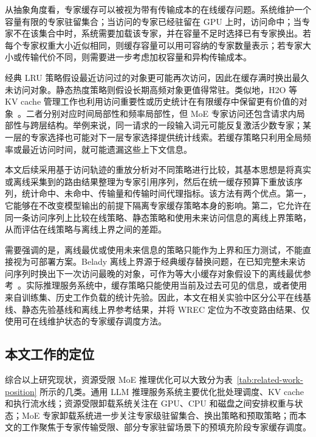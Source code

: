 从抽象角度看，专家缓存可以被视为带有传输成本的在线缓存问题。系统维护一个容量有限的专家驻留集合；当访问的专家已经驻留在 GPU 上时，访问命中；当专家不在该集合中时，系统需要加载该专家，并在容量不足时选择已有专家换出。若每个专家权重大小近似相同，则缓存容量可以用可容纳的专家数量表示；若专家大小或传输代价不同，则需要进一步考虑加权容量和异构传输成本。

经典 LRU 策略假设最近访问过的对象更可能再次访问，因此在缓存满时换出最久未访问对象。静态热度策略则假设长期高频对象更值得常驻。类似地，H2O 等 KV cache 管理工作也利用访问重要性或历史统计在有限缓存中保留更有价值的对象~\cite{zhang2024h2o}。二者分别对应时间局部性和频率局部性，但 MoE 专家访问还包含请求内局部性与跨层结构。举例来说，同一请求的一段输入词元可能反复激活少数专家；某一层的专家选择也可能对下一层专家选择提供统计线索。若缓存策略只利用全局频率或最近访问时间，就可能遗漏这些上下文信息。

本文后续采用基于访问轨迹的重放分析对不同策略进行比较，其基本思想是将真实或离线采集到的路由结果整理为专家引用序列，然后在统一缓存预算下重放该序列，统计命中、未命中、传输量和传输时间代理指标。该方法有两个优点。第一，它能够在不改变模型输出的前提下隔离专家缓存策略本身的影响。第二，它允许在同一条访问序列上比较在线策略、静态策略和使用未来访问信息的离线上界策略，从而评估在线策略与离线上界之间的差距。

需要强调的是，离线最优或使用未来信息的策略只能作为上界和压力测试，不能直接视为可部署方案。Belady 离线上界源于经典缓存替换问题，在已知完整未来访问序列时换出下一次访问最晚的对象，可作为等大小缓存对象假设下的离线最优参考~\cite{belady1966study}。实际推理服务系统中，缓存策略只能使用当前及过去可见的信息，或者使用来自训练集、历史工作负载的统计先验。因此，本文在相关实验中区分公平在线基线、静态先验基线和离线上界参考结果，并将 WREC 定位为不改变路由结果、仅使用可在线维护状态的专家缓存调度方法。

\subsection{本文工作的定位}

综合以上研究现状，资源受限 MoE 推理优化可以大致分为表~\ref{tab:related-work-position} 所示的几类。通用 LLM 推理服务系统主要优化批处理调度、KV cache 和执行流水线；资源受限卸载系统关注在 GPU、CPU 和磁盘之间安排权重与状态；MoE 专家卸载系统进一步关注专家级驻留集合、换出策略和预取策略；而本文的工作聚焦于专家传输受限、部分专家驻留场景下的预填充阶段专家缓存调度。

